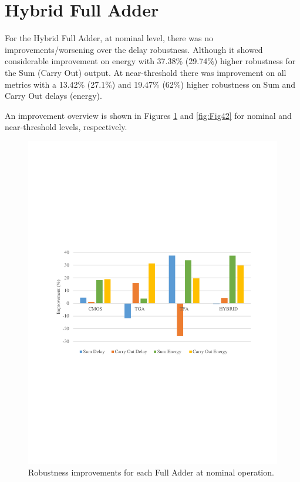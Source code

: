 \documentclass[ecp,tc, english]{iiufrgs}
\begin{document}
\section{Hybrid Full Adder}
For the Hybrid Full Adder, at nominal level, there was no improvements/worsening over the delay robustness. Although it showed considerable improvement on energy with 37.38\% (29.74\%) higher robustness for the Sum (Carry Out) output. 
At near-threshold there was improvement on all metrics with a 13.42\% (27.1\%) and 19.47\% (62\%) higher robustness on Sum and Carry Out delays (energy).

An improvement overview is shown in Figures \ref{fig:Fig41} and \ref{fig:Fig42} for nominal and near-threshold levels, respectively.

\begin{figure}[H]
\centering
\includegraphics[width=\textwidth, trim={0 9.5cm 0 9cm},clip]{improvNominal.pdf}
\caption{Robustness improvements for each Full Adder at nominal operation.}
\label{fig:Fig41}
\end{figure}
\end{document}
